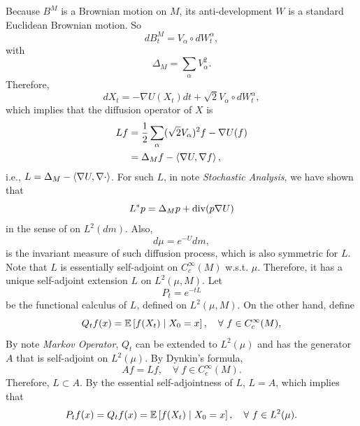 Because $B^M$ is a Brownian motion on $M$, its anti-development $W$ is a standard Euclidean Brownian motion. So
\begin{equation*}
    dB^M_t = V_\alpha \circ dW^\alpha_t,
\end{equation*}
with
\begin{equation*}
    \Delta_M = \sum_\alpha V_\alpha^2.
\end{equation*}
Therefore,
\begin{equation*}
    dX_t = -\nabla U(X_t) dt + \sqrt{2}V_\alpha \circ dW^\alpha_t,
\end{equation*}
which implies that the diffusion operator of $X$ is
\begin{align*}
    Lf &= \frac{1}{2} \sum_\alpha (\sqrt{2}V_\alpha)^2 f - \nabla U (f) \\
    &= \Delta_M f - \left\langle \nabla U,\nabla f \right\rangle,
\end{align*}
i.e., $L = \Delta_M - \left\langle \nabla U, \nabla \cdot \right\rangle$. For such $L$, in note \emph{Stochastic Analysis}, we have shown that 
\begin{equation*}
    L^*p = \Delta_M p + \operatorname{div}(p\nabla U)
\end{equation*}
in the sense of on $L^2(dm)$. Also,
\begin{equation*}
    d\mu = e^{-U}dm,
\end{equation*}
is the invariant measure of such diffusion process, which is also symmetric for $L$. Note that $L$ is essentially self-adjoint on $C^\infty_c(M)$ w.s.t. $\mu$. Therefore, it has a unique self-adjoint extension $L$ on $L^2(\mu,M)$. Let
\begin{equation*}
    P_t = e^{-tL}
\end{equation*}
be the functional calculus of $L$, defined on $L^2(\mu,M)$. On the other hand, define
\begin{equation*}
    Q_t f(x) = \mathbb{E}\left[f(X_t) \mid X_0 = x\right],\quad \forall~ f \in C_c^\infty(M),
\end{equation*} 
By note \emph{Markov Operator}, $Q_t$ can be extended to $L^2(\mu)$ and has the generator $A$ that is self-adjoint on $L^2(\mu)$. By Dynkin's formula,
\begin{equation*}
    Af = Lf,\quad \forall~f \in C_c^\infty(M).
\end{equation*}
Therefore, $L \subset A$. By the essential self-adjointness of $L$, $L = A$, which implies that
\begin{equation*}
    P_tf(x) = Q_tf(x) = \mathbb{E}\left[f(X_t) \mid X_0 = x\right],\quad \forall~f \in L^2(\mu).
\end{equation*}
